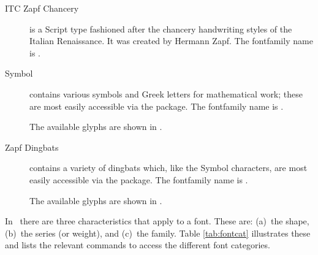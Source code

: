\begin{description}
{\vspace{0.5\onelineskip}
\fox\par\Kafka\par\namesAZ
\vspace{0.5\onelineskip}
}

\item[ITC Zapf Chancery\facesubseeidx{Zapf Chancery}] 
  { is a 
Script type fashioned after the chancery
handwriting styles of the Italian Renaissance. It was created by
Hermann Zapf.
The fontfamily name is .

\vspace{0.5\onelineskip}
\fox\par\Kafka\par\namesAZ
\vspace{0.5\onelineskip}
}

\item[Symbol\facesubseeidx{Symbol}]
  { contains various symbols and Greek letters for 
  mathematical work; these are most easily accessible via
  the  package.
The fontfamily name is .

    The available glyphs are shown in .
}

\item[Zapf Dingbats]
  { contains a variety of dingbats which, like the Symbol
   characters, are most easily 
   accessible via the  package.
The fontfamily name is .

    The available glyphs are shown in .
}


\end{description}

    In \ltx\ there are three characteristics that apply to a font. These are:
(a)~the shape, 
(b)~the series 
(or weight), %
and (c)~the family. 
Table \ref{tab:fontcat} illustrates these and lists the relevant 
commands to access the different font categories.

